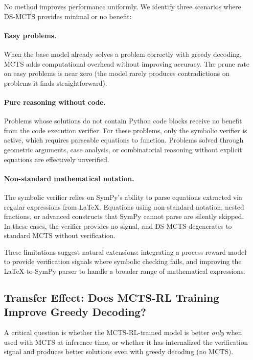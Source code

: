 \documentclass[11pt,a4paper]{article}
\begin{document}
No method improves performance uniformly. We identify three scenarios where
DS-MCTS provides minimal or no benefit:

\paragraph{Easy problems.} When the base model already solves a problem
correctly with greedy decoding, MCTS adds computational overhead without
improving accuracy. The prune rate on easy problems is near zero (the model
rarely produces contradictions on problems it finds straightforward).

\paragraph{Pure reasoning without code.} Problems whose solutions do not contain
Python code blocks receive no benefit from the code execution verifier. For
these problems, only the symbolic verifier is active, which requires parseable
equations to function. Problems solved through geometric arguments, case
analysis, or combinatorial reasoning without explicit equations are effectively
unverified.

\paragraph{Non-standard mathematical notation.} The symbolic verifier relies on
SymPy's ability to parse equations extracted via regular expressions from LaTeX.
Equations using non-standard notation, nested fractions, or advanced constructs
that SymPy cannot parse are silently skipped. In these cases, the verifier
provides no signal, and DS-MCTS degenerates to standard MCTS without
verification.

These limitations suggest natural extensions: integrating a process reward
model to provide verification signals where symbolic checking fails, and
improving the LaTeX-to-SymPy parser to handle a broader range of mathematical
expressions.


\subsection{Transfer Effect: Does MCTS-RL Training Improve Greedy Decoding?}

A critical question is whether the MCTS-RL-trained model is better \emph{only}
when used with MCTS at inference time, or whether it has internalized the
verification signal and produces better solutions even with greedy decoding
(no MCTS).
\end{document}
